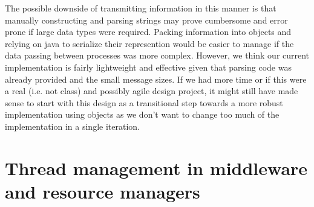 \documentclass{article}
\begin{document}
The possible downside of transmitting information in this manner is that manually constructing and parsing strings may prove cumbersome and error prone if large data types were required. 
Packing information into objects and relying on java to serialize their represention would be easier to manage if the data passing between processes was more complex. 
However, we think our current implementation is fairly lightweight and effective given that parsing code was already provided and the small message sizes. 
If we had more time or if this were a real (i.e. not class) and possibly agile design project, it might still have made sense to start with this design as a transitional step towards a more robust implementation using objects as we don't want to change too much of the implementation in a single iteration. 
 



\section{Thread management in middleware and resource managers}
\end{document}
